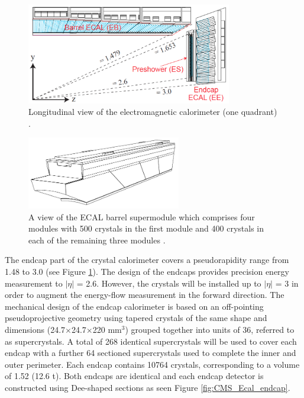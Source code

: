 \begin{figure}[h!]
\begin{center}
\includegraphics[width=0.8\textwidth]{figures/CMS/ECAL/Ecal_layout.png}
\caption{Longitudinal view of the electromagnetic calorimeter (one quadrant) \cite{CMS_TDR1}.}
\label{fig:CMS_Ecal_2}
\end{center}
\end{figure}

\begin{figure}[h!]
\begin{center}
\includegraphics[width=0.6\textwidth]{figures/CMS/ECAL/cms_ecalSupermodule.png}
\caption{A view of the ECAL barrel supermodule which comprises four modules with 500 crystals in the first module and 400 crystals in each of the remaining three modules \cite{ECAL_TDR}.}
\label{fig:CMS_Ecal_Barrel_supermodule}
\end{center}
\end{figure}

The endcap part of the crystal calorimeter covers a pseudorapidity range from 1.48 to 3.0 (see Figure \ref{fig:CMS_Ecal_2}). The design of the endcaps provides precision energy measurement to $|\eta|$ = 2.6. However, the crystals will be installed up to $|\eta|$ = 3 in order to augment the energy-flow measurement in the forward direction. The mechanical design of the endcap calorimeter is based on an off-pointing pseudoprojective geometry using tapered crystals of the same shape and dimensions (24.7$\times$24.7$\times$220 $\mathrm{mm^{3}}$) grouped together into units of 36, referred to as supercrystals. A total of 268 identical supercrystals will be used to cover each endcap with a further 64 sectioned supercrystals used to complete the inner and outer perimeter. Each endcap contains 10764 crystals, corresponding to a volume of 1.52 \mThree (12.6 t). Both endcaps are identical and each endcap detector is constructed using Dee-shaped sections as seen Figure \ref{fig:CMS_Ecal_endcap}.

